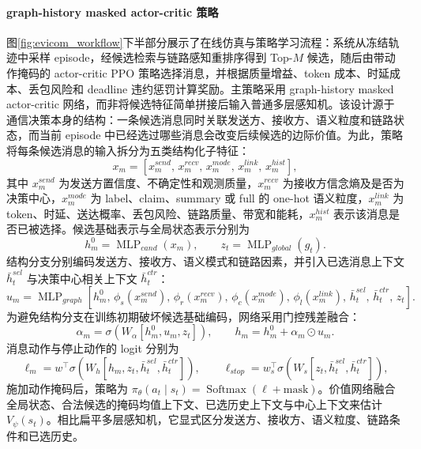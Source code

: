\paragraph{graph-history masked actor-critic 策略}
图\ref{fig:evicom_workflow}下半部分展示了在线仿真与策略学习流程：系统从冻结轨迹中采样 episode，经候选检索与链路感知重排序得到 Top-$M$ 候选，随后由带动作掩码的 actor-critic PPO 策略选择消息，并根据质量增益、token 成本、时延成本、丢包风险和 deadline 违约惩罚计算奖励。主策略采用 graph-history masked actor-critic 网络，而非将候选特征简单拼接后输入普通多层感知机。该设计源于通信决策本身的结构：一条候选消息同时关联发送方、接收方、语义粒度和链路状态，而当前 episode 中已经选过哪些消息会改变后续候选的边际价值。为此，策略将每条候选消息的输入拆分为五类结构化子特征：
\begin{equation}
x_m=\left[x_m^{send},\,x_m^{recv},\,x_m^{mode},\,x_m^{link},\,x_m^{hist}\right],
\end{equation}
其中 $x_m^{send}$ 为发送方置信度、不确定性和观测质量，$x_m^{recv}$ 为接收方信念熵及是否为决策中心，$x_m^{mode}$ 为 label、claim、summary 或 full 的 one-hot 语义粒度，$x_m^{link}$ 为 token、时延、送达概率、丢包风险、链路质量、带宽和能耗，$x_m^{hist}$ 表示该消息是否已被选择。候选基础表示与全局状态表示分别为
\begin{equation}
h_m^{0}=\operatorname{MLP}_{cand}(x_m),\qquad z_t=\operatorname{MLP}_{global}(g_t).
\end{equation}
结构分支分别编码发送方、接收方、语义模式和链路因素，并引入已选消息上下文 $\bar{h}_t^{sel}$ 与决策中心相关上下文 $\bar{h}_t^{ctr}$：
\begin{equation}
u_m=\operatorname{MLP}_{graph}\!\left[h_m^{0},\,\phi_s(x_m^{send}),\,\phi_r(x_m^{recv}),\,\phi_c(x_m^{mode}),\,\phi_l(x_m^{link}),\,\bar{h}_t^{sel},\,\bar{h}_t^{ctr},\,z_t\right].
\end{equation}
为避免结构分支在训练初期破坏候选基础编码，网络采用门控残差融合：
\begin{equation}
\alpha_m=\sigma\!\left(W_\alpha[h_m^{0},u_m,z_t]\right),\qquad h_m=h_m^{0}+\alpha_m\odot u_m.
\end{equation}
消息动作与停止动作的 logit 分别为
\begin{equation}
\ell_m=w^{\top}\sigma\!\left(W_h[h_m,z_t,\bar{h}_t^{sel},\bar{h}_t^{ctr}]\right),\qquad
\ell_{stop}=w_s^{\top}\sigma\!\left(W_s[z_t,\bar{h}_t^{sel},\bar{h}_t^{ctr}]\right),
\end{equation}
施加动作掩码后，策略为 $\pi_\theta(a_t\mid s_t)=\operatorname{Softmax}(\ell+\text{mask})$。价值网络融合全局状态、合法候选的掩码均值上下文、已选历史上下文与中心上下文来估计 $V_\psi(s_t)$。相比扁平多层感知机，它显式区分发送方、接收方、语义粒度、链路条件和已选历史。


